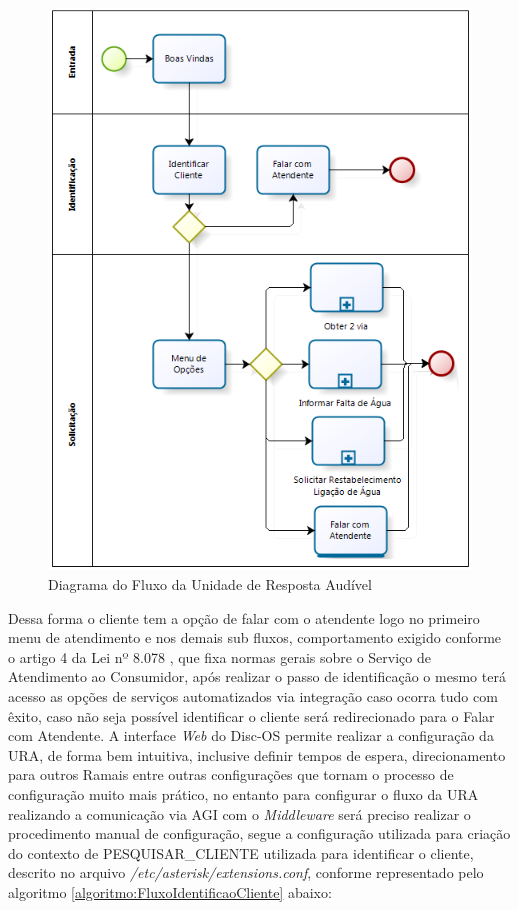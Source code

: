 \begin{figure}[H]
	\centering
	\caption{Diagrama do Fluxo da Unidade de Resposta Audível}
	\label{figura:fluxoURA}	
	\includegraphics{figuras/fluxo_ura.png}
\end{figure}


Dessa forma o cliente tem a opção de falar com o atendente logo no primeiro menu de atendimento e nos demais sub fluxos, comportamento exigido conforme o artigo 4 da Lei nº 8.078 \cite{leiAtendimentoAoConsumidor}, que fixa normas gerais sobre o Serviço de Atendimento ao Consumidor, após realizar o passo de identificação o mesmo terá acesso as opções de serviços automatizados via integração caso ocorra tudo com êxito, caso não seja possível identificar o cliente será redirecionado para o Falar com Atendente.
A interface \textit{Web} do Disc-OS permite realizar a configuração da URA, de forma bem intuitiva, inclusive definir tempos de espera, direcionamento para outros Ramais entre outras configurações que tornam o processo de configuração muito mais prático, no entanto para configurar o fluxo da URA realizando a comunicação via AGI com o \textit{Middleware} será preciso realizar o procedimento manual de configuração, segue a configuração utilizada para criação do contexto de PESQUISAR\_CLIENTE utilizada para identificar o cliente, descrito no arquivo \textit{/etc/asterisk/extensions.conf}, conforme representado pelo algoritmo \ref{algoritmo:FluxoIdentificaoCliente} abaixo:


